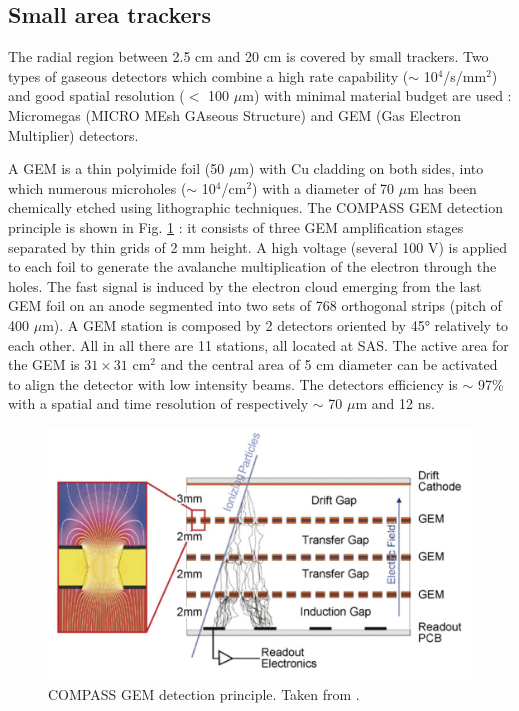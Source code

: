 \subsection{Small area trackers}

The radial region between 2.5 cm and 20 cm is covered by small trackers. Two types of gaseous detectors which combine a high rate capability ($\sim$ 10$^4$/s/mm$^2$) and good spatial resolution ($<$ 100 $\mu$m) with minimal material budget are used : Micromegas (MICRO MEsh GAseous Structure) and GEM (Gas Electron Multiplier) detectors.

A GEM is a thin polyimide foil (50 $\mu$m) with Cu cladding on both sides, into which numerous microholes ($\sim$ 10$^4$/cm$^2$) with a diameter of 70 $\mu$m has been chemically etched using lithographic techniques. The COMPASS GEM detection principle is shown in Fig. \ref{pic:GEM} : it consists of three GEM amplification stages separated by thin grids of 2 mm height. A high voltage (several 100 V) is applied to each foil to generate the avalanche multiplication of the electron through the holes. The fast signal is induced by the electron cloud emerging from the last GEM foil on an anode segmented into two sets of 768 orthogonal strips (pitch of 400 $\mu$m). A GEM station is composed by 2 detectors oriented by 45° relatively to each other. All in all there are 11 stations, all located at SAS. The active area for the GEM is $31 \times 31$ cm$^2$ and the central area of 5 cm diameter can be activated to align the detector with low intensity beams. The detectors efficiency is $\sim$ 97\% with a spatial and time resolution of respectively $\sim$ 70 $\mu$m and 12 ns.

\begin{figure}[!h]
  \centering
	\includegraphics[scale=0.5]{./gfx/GEM.png}
	\caption{COMPASS GEM detection principle. Taken from \cite{NIM}.}
	\label{pic:GEM}
\end{figure}

